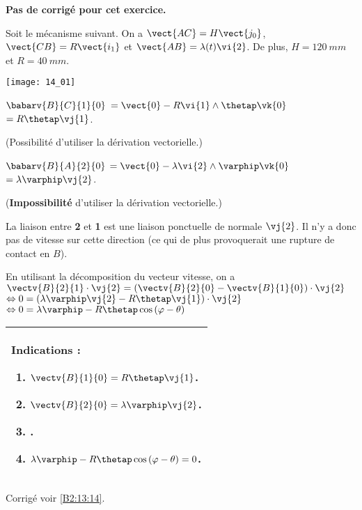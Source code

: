 \normalfalse \difficiletrue \tdifficilefalse
\correctiontrue


\setcounter{question}{0}
\ifcorrection
\else
\textbf{Pas de corrigé pour cet exercice.}
\fi

\ifprof
\else
Soit le mécanisme suivant. On a $\vect{AC}=H\vect{j_0}$, $\vect{CB}=R\vect{i_1}$ et $\vect{AB}=\lambda(t) \vi{2}$. De plus, 
$H=\SI{120}{mm}$ et $R=\SI{40}{mm}$. 

\begin{center}
\texttt{[image: 14\_01]}
\end{center}
\fi


\ifprof
$\babarv{B}{C}{1}{0}$ 
$=\vect{0}-R\vi{1}\wedge\thetap\vk{0}$
$=R\thetap\vj{1}$.

(Possibilité d'utiliser la dérivation vectorielle.)

\else
\fi

\ifprof
$\babarv{B}{A}{2}{0}$ 
$=\vect{0}-\lambda \vi{2}\wedge\varphip\vk{0}$
$=\lambda\varphip\vj{2}$.

(\textbf{Impossibilité} d'utiliser la dérivation vectorielle.)

\else
\fi

\ifprof
La liaison entre \textbf{2} et \textbf{1} est une liaison ponctuelle de normale $\vj{2}$. Il n'y a donc pas de vitesse sur cette direction (ce qui de plus provoquerait une rupture de contact en $B$). 
\else
\fi

\ifprof
En utilisant la décomposition du vecteur vitesse, on a
$\vectv{B}{2}{1}\cdot \vj{2} =\left( \vectv{B}{2}{0} - \vectv{B}{1}{0}\right) \cdot \vj{2}$
$ \Leftrightarrow {0} =\left( \lambda\varphip\vj{2} - R\thetap\vj{1}\right) \cdot \vj{2}$
$ \Leftrightarrow {0} = \lambda\varphip - R\thetap \cos \left( \varphi - \theta\right)$

\else
\fi





\ifprof
\else
\footnotesize
\ifcolle
\else
\begin{center}
\begin{tabular}{|p{.9\linewidth}|}
\hline
Indications :
\begin{enumerate}
\item $\vectv{B}{1}{0}=R\thetap\vj{1}$.
\item $\vectv{B}{2}{0}=\lambda\varphip\vj{2}$.
\item .
\item $ \lambda\varphip - R\thetap \cos \left( \varphi - \theta\right)=0$.
\end{enumerate} \\ \hline
\end{tabular}
\end{center}
\fi
\normalsize

\begin{flushright}
\footnotesize{Corrigé  voir \ref{B2:13:14}.}
\end{flushright}%
\fi